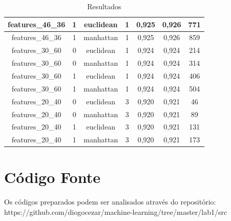 \documentclass[9pt,twocolumn]{article}
\begin{document}
\begin{table}[t]
\begin{tabular}{|c|c|c|c|c|c|c|}
  features\_46\_36    & 1                   & euclidean         & 1          & 0,925             & 0,926            & 771                     \\ \hline
  features\_46\_36    & 1                   & manhattan         & 1          & 0,925             & 0,926            & 859                     \\ \hline
  features\_30\_60    & 0                   & euclidean         & 1          & 0,924             & 0,924            & 214                     \\ \hline
  features\_30\_60    & 0                   & manhattan         & 1          & 0,924             & 0,924            & 314                     \\ \hline
  features\_30\_60    & 1                   & euclidean         & 1          & 0,924             & 0,924            & 406                     \\ \hline
  features\_30\_60    & 1                   & manhattan         & 1          & 0,924             & 0,924            & 504                     \\ \hline
  features\_20\_40    & 0                   & euclidean         & 3          & 0,920             & 0,921            & 46                      \\ \hline
  features\_20\_40    & 0                   & manhattan         & 3          & 0,920             & 0,921            & 89                      \\ \hline
  features\_20\_40    & 1                   & euclidean         & 3          & 0,920             & 0,921            & 131                     \\ \hline
  features\_20\_40    & 1                   & manhattan         & 3          & 0,920             & 0,921            & 173                     \\ \hline
  \end{tabular}
  \caption{Resultados}
  \label{tab:resultados}
\end{table}

\section{Código Fonte}

Os códigos preparados podem ser analisados através do repositório: https://github.com/diogocezar/machine-learning/tree/master/lab1/src
\end{document}
